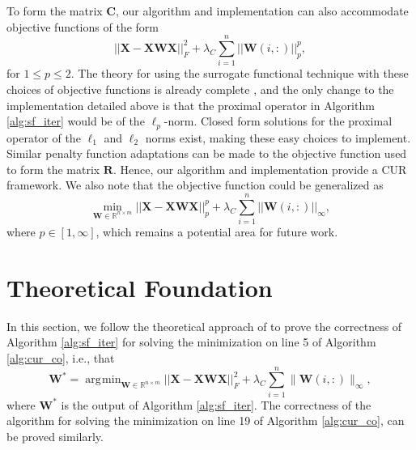 \documentclass[12pt]{article}
\DeclareMathOperator*{\argmin}{\arg\!\min}
\begin{document}
To form the matrix $\mathbf{C}$, our algorithm and implementation can also accommodate objective functions of the form 
\[
||\mathbf{X-XWX}||_F^2 + \lambda_C \sum_{i=1}^n ||\mathbf{W}(i,:)||_p^p,
\]
for $1 \leq p \leq 2$.  The theory for using the surrogate functional technique with these choices of objective functions is already complete \cite{daubechies_etal_2004}, and the only change to the implementation detailed above is that the proximal operator in Algorithm \ref{alg:sf_iter} would be of the $\ell_p$-norm.  Closed form solutions for the proximal operator of the $\ell_1$ and $\ell_2$ norms exist, making these easy choices to implement.  Similar penalty function adaptations can be made to the objective function used to form the matrix $\mathbf{R}$.  Hence, our algorithm and implementation provide a CUR framework.  We also note that the objective function could be generalized as
\[
\min_{\mathbf{W} \in \mathbb{R}^{n \times m}} ||\mathbf{X-XWX}||_p^p + \lambda_C \sum_{i=1}^n ||\mathbf{W}(i,:)||_{\infty},
\]
where $p \in [1, \infty]$, which remains a potential area for future work.


\section{Theoretical Foundation}
\label{sec:cur_thms}

In this section, we follow the theoretical approach of \cite{daubechies_etal_2004} to prove the correctness of Algorithm \ref{alg:sf_iter} for solving the minimization on line 5 of Algorithm \ref{alg:cur_co}, i.e., that 
\[
\mathbf{W^*} = \argmin_{\mathbf{W} \in \mathbb{R}^{n \times m}} ||\mathbf{X-XWX}||_F^2 + \lambda_C \sum_{i=1}^n  \|\mathbf{W}(i,:) \|_{\infty},
\]
where $\mathbf{W^*}$ is the output of Algorithm \ref{alg:sf_iter}.  
The correctness of the algorithm for solving the minimization on line 19 of Algorithm \ref{alg:cur_co}, can be proved similarly.  
\end{document}
